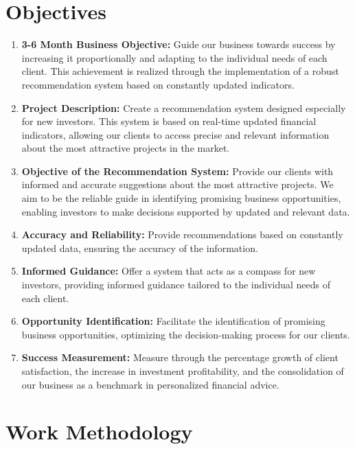 \documentclass[12pt]{article}
\begin{document}
\section{Objectives}
\begin{enumerate}
    \item \textbf{3-6 Month Business Objective:} Guide our business towards success by increasing it proportionally and adapting to the individual needs of each client. This achievement is realized through the implementation of a robust recommendation system based on constantly updated indicators.
    
    \item \textbf{Project Description:} Create a recommendation system designed especially for new investors. This system is based on real-time updated financial indicators, allowing our clients to access precise and relevant information about the most attractive projects in the market.
    
    \item \textbf{Objective of the Recommendation System:} Provide our clients with informed and accurate suggestions about the most attractive projects. We aim to be the reliable guide in identifying promising business opportunities, enabling investors to make decisions supported by updated and relevant data.
    
    \item \textbf{Accuracy and Reliability:} Provide recommendations based on constantly updated data, ensuring the accuracy of the information.
    
    \item \textbf{Informed Guidance:} Offer a system that acts as a compass for new investors, providing informed guidance tailored to the individual needs of each client.
    
    \item  \textbf{Opportunity Identification:} Facilitate the identification of promising business opportunities, optimizing the decision-making process for our clients.
    
    \item \textbf{Success Measurement:} Measure through the percentage growth of client satisfaction, the increase in investment profitability, and the consolidation of our business as a benchmark in personalized financial advice.
\end{enumerate}

\section{Work Methodology}
\end{document}
